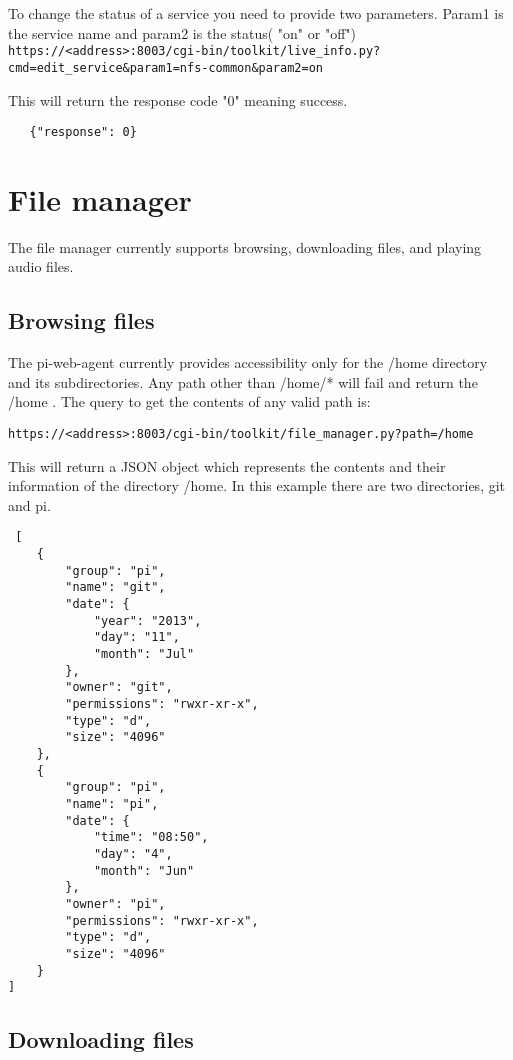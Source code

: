 \documentclass[12pt]{article}
\begin{document}
 To change the status of a service you need to provide two parameters. Param1 is the service name and param2 is the status( "on" or "off")\\
 
 
 \texttt{https://<address>:8003/cgi-bin/toolkit/live\_info.py?\\
 cmd=edit\_service\&param1=nfs-common\&param2=on}
 
 
 This will return the response code "0" meaning success.
 \begin{verbatim}
   {"response": 0}
 \end{verbatim}
 
 \section{File manager}
 
 The file manager currently supports browsing, downloading files, and playing audio files. 
 
 \subsection{Browsing files}
 
 The pi-web-agent currently provides accessibility only for the /home directory and its subdirectories. Any path other than /home/* will fail and return the /home . The query to get the contents of any valid path is:
 
 
 \texttt{https://<address>:8003/cgi-bin/toolkit/file\_manager.py?path=/home}
 
 This will return a JSON object which represents the contents and their information of the directory /home. In this example there are two directories, git and pi.
 
 \begin{verbatim}
 [
    {
        "group": "pi",
        "name": "git",
        "date": {
            "year": "2013",
            "day": "11",
            "month": "Jul"
        },
        "owner": "git",
        "permissions": "rwxr-xr-x",
        "type": "d",
        "size": "4096"
    },
    {
        "group": "pi",
        "name": "pi",
        "date": {
            "time": "08:50",
            "day": "4",
            "month": "Jun"
        },
        "owner": "pi",
        "permissions": "rwxr-xr-x",
        "type": "d",
        "size": "4096"
    }
]
 \end{verbatim}
 
 \subsection{Downloading files}
 
\end{document}
